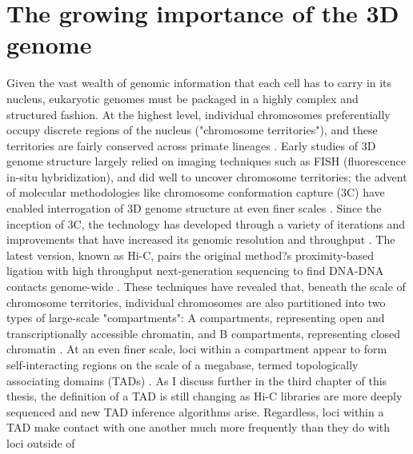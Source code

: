 {\section{The growing importance of the 3D genome}
Given the vast wealth of genomic information that each cell has to carry in its nucleus, eukaryotic genomes must be packaged in a highly complex and structured fashion. At the highest level, individual chromosomes preferentially occupy discrete regions of the nucleus ("chromosome territories"), and these territories are fairly conserved across primate lineages \cite{Meaburn and Misteli 2007 (Chromosome territories), Mora et al. 2006 (Chromosome territory positioning of conserved homologous chromosomes in different primate species), Tanabe et al. 2002 (Evolutionary conservation of chromosome territory arrangements in cell nuclei from higher primates)}. Early studies of 3D genome structure largely relied on imaging techniques such as FISH (fluorescence in-situ hybridization), and did well to uncover chromosome territories; the advent of molecular methodologies like chromosome conformation capture (3C) have enabled interrogation of 3D genome structure at even finer scales \cite{Dekker et al 2002 (Capturing chromosome conformation)}. Since the inception of 3C, the technology has developed through a variety of iterations and improvements that have increased its genomic resolution and throughput \cite{Fraser et al. 2015 (An overview of genome organization and how we got there: from FISH to Hi-C)}. The latest version, known as Hi-C, pairs the original method?s proximity-based ligation with high throughput next-generation sequencing to find DNA-DNA contacts genome-wide \cite{Lieberman-Aiden et al. 2009 (Comprehensive mapping of long-range interactions reveals folding principles of the human genome)}. These techniques have revealed that, beneath the scale of chromosome territories, individual chromosomes are also partitioned into two types of large-scale "compartments": A compartments, representing open and transcriptionally accessible chromatin, and B compartments, representing closed chromatin \cite{Lieberman-Aiden et al. 2009 (Comprehensive mapping of long-range interactions reveals folding principles of the human genome), Naumova and Dekker 2010 (Integrating one-dimensional and three-dimensional maps of genomes)}. At an even finer scale, loci within a compartment appear to form self-interacting regions on the scale of a megabase, termed topologically associating domains (TADs) \cite{Dixon et al. 2012 (Topological domains in mammalian genomes identified by analysis of chromatin interactions), Nora et al. 2012 (Spatial partitioning of the regulatory landscape of the X-inactivation centre), Hou et al. 2012 (Gene density, transcription, and insulators contribute to the partition of the Drosohila genome into physical domains), Sexton et al. 2012 (Three-dimensional folding and functional organization principles of the drosophila genome)}. As I discuss further in the third chapter of this thesis, the definition of a TAD is still changing as Hi-C libraries are more deeply sequenced and new TAD inference algorithms arise. Regardless, loci within a TAD make contact with one another much more frequently than they do with loci outside of }
